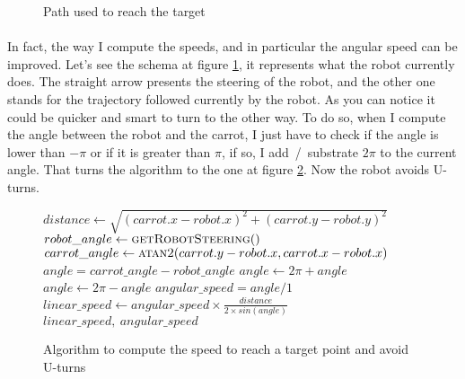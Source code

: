 \begin{figure}[!h]
    \begin{center}
        
    \end{center}
    
    \caption{
        \label{fig:path}
        Path used to reach the target
    }
\end{figure}

\paragraph{}{
    In fact, the way I compute the speeds, and in particular the angular speed
can be improved. Let's see the schema at figure \ref{fig:path}, it represents
what the robot currently does. The straight arrow presents the steering of the
robot, and the other one stands for the trajectory followed currently by the
robot. As you can notice it could be quicker and smart to turn to the other 
way. To do so, when I compute the angle between the robot and the carrot, I
just have to check if the angle is lower than $-\pi$ or if it is greater than $\pi$, if so, I add~/~substrate $2\pi$ to the current angle. That turns the
algorithm to the one at figure \ref{algo:speeds_smart}. Now the robot avoids 
U-turns.
}

\begin{figure}[!h]
    \begin{algorithmic}
        \State $distance \gets \sqrt{(carrot.x - robot.x)^{2} + (carrot.y - robot.y)^{2}}$
        \State $robot\_angle \gets \Call{getRobotSteering}$
        \State $carrot\_angle \gets \Call{atan2}{carrot.y - robot.x, carrot.x - robot.x}$
        \State $angle = carrot\_angle - robot\_angle$
            \State $ angle \gets 2\pi + angle $
        \EndIf
            \State $ angle \gets 2\pi - angle $
        \EndIf
        \State $angular\_speed = angle / 1$
        \State $linear\_speed \gets angular\_speed \times \frac{distance}{2 \times sin( angle )} $
        \State \Return $linear\_speed,~angular\_speed$
     \EndFunction
    \end{algorithmic}
    
    \caption{
        \label{algo:speeds_smart}
        Algorithm to compute the speed to reach a target point and avoid U-turns
    }
\end{figure}

\paragraph{}{
}

